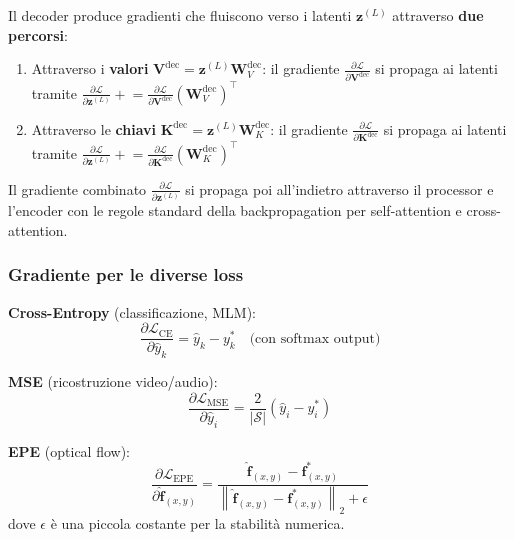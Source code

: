\documentclass[12pt,a4paper]{article}
\begin{document}
\begin{notabox}
Il decoder produce gradienti che fluiscono verso i latenti $\mathbf{z}^{(L)}$ attraverso \textbf{due percorsi}:
\begin{enumerate}
    \item Attraverso i \textbf{valori} $\mathbf{V}^{\text{dec}} = \mathbf{z}^{(L)} \mathbf{W}_V^{\text{dec}}$: il gradiente $\frac{\partial \mathcal{L}}{\partial \mathbf{V}^{\text{dec}}}$ si propaga ai latenti tramite $\frac{\partial \mathcal{L}}{\partial \mathbf{z}^{(L)}} \mathrel{+}= \frac{\partial \mathcal{L}}{\partial \mathbf{V}^{\text{dec}}} (\mathbf{W}_V^{\text{dec}})^\top$
    \item Attraverso le \textbf{chiavi} $\mathbf{K}^{\text{dec}} = \mathbf{z}^{(L)} \mathbf{W}_K^{\text{dec}}$: il gradiente $\frac{\partial \mathcal{L}}{\partial \mathbf{K}^{\text{dec}}}$ si propaga ai latenti tramite $\frac{\partial \mathcal{L}}{\partial \mathbf{z}^{(L)}} \mathrel{+}= \frac{\partial \mathcal{L}}{\partial \mathbf{K}^{\text{dec}}} (\mathbf{W}_K^{\text{dec}})^\top$
\end{enumerate}
Il gradiente combinato $\frac{\partial \mathcal{L}}{\partial \mathbf{z}^{(L)}}$ si propaga poi all'indietro attraverso il processor e l'encoder con le regole standard della backpropagation per self-attention e cross-attention.
\end{notabox}

\subsubsection{Gradiente per le diverse loss}

\begin{formulabox}
\textbf{Cross-Entropy} (classificazione, MLM):
\[
\frac{\partial \mathcal{L}_{\text{CE}}}{\partial \hat{y}_k} = \hat{y}_k - y_k^* \quad \text{(con softmax output)}
\]

\textbf{MSE} (ricostruzione video/audio):
\[
\frac{\partial \mathcal{L}_{\text{MSE}}}{\partial \hat{y}_i} = \frac{2}{|\mathcal{S}|}(\hat{y}_i - y_i^*)
\]

\textbf{EPE} (optical flow):
\[
\frac{\partial \mathcal{L}_{\text{EPE}}}{\partial \hat{\mathbf{f}}_{(x,y)}} = \frac{\hat{\mathbf{f}}_{(x,y)} - \mathbf{f}_{(x,y)}^*}{\left\|\hat{\mathbf{f}}_{(x,y)} - \mathbf{f}_{(x,y)}^*\right\|_2 + \epsilon}
\]
dove $\epsilon$ \`e una piccola costante per la stabilit\`a numerica.
\end{formulabox}
\end{document}
